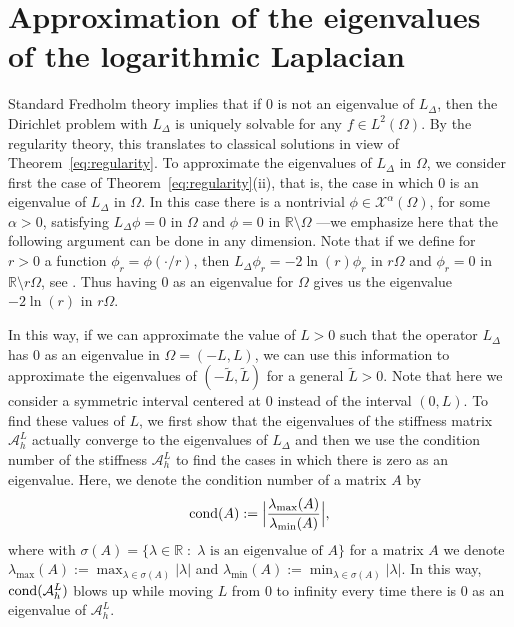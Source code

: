 \documentclass[11 pt]{article}
\numberwithin{equation}{section}
\def\tilde{\widetilde}
\def\R{\mathbb{R}}
\begin{document}
\section{Approximation of the eigenvalues of the logarithmic Laplacian}\label{eigenvalue approximation:sec}

Standard Fredholm theory implies that if $0$ is not an eigenvalue of $L_\Delta$, then the Dirichlet problem with $L_{\Delta}$ is uniquely solvable for any $f\in L^2(\Omega)$. By the regularity theory, this translates to classical solutions in view of  Theorem~\ref{eq:regularity}. To approximate the eigenvalues of $L_{\Delta}$ in $\Omega$, we consider first the case of Theorem~\ref{eq:regularity}(ii), that is, the case in which $0$ is an eigenvalue of $L_{\Delta}$ in $\Omega$. In this case there is a nontrivial $\phi\in \mathcal X^{\alpha}(\Omega)$, for some $\alpha>0$, satisfying $L_{\Delta}\phi=0$ in  $\Omega$ and $\phi=0$ in $\R\setminus \Omega$ ---we emphasize here that the following argument can be done in any dimension. Note that if we define for $r>0$ a function $\phi_r=\phi(\cdot/r)$, then $L_{\Delta}\phi_r=-2\ln(r)\phi_r$ in $r\Omega$ and $\phi_r=0$ in $\R\setminus r\Omega$, see \cite[Lemma 2.5]{LW21}. Thus having $0$ as an eigenvalue for $\Omega$ gives us the eigenvalue $-2\ln(r)$ in $r\Omega$.

In this way, if we can approximate the value of $L>0$ such that the operator $L_{\Delta}$ has $0$ as an eigenvalue in $\Omega=(-L,L)$, we can use this information to approximate the eigenvalues of $(-\tilde{L},\tilde{L})$ for a general $\tilde{L}>0$. Note that here we consider a symmetric interval centered at $0$ instead of the interval $(0,L)$. To find these values of $L$, we first show that the eigenvalues of the stiffness matrix $\mathcal A_h^L$ actually converge to the eigenvalues of $L_{\Delta}$ and then we use the condition number of the stiffness $\mathcal{A}^L_h$ to find the cases in which there is zero as an eigenvalue. Here, we denote the condition number of a matrix $A$ by
\begin{equation}\label{defi:condition}
\textnormal{cond}(A):=\Big|\frac{\lambda_{\max}(A)}{\lambda_{\min}(A)}\Big|,
\end{equation}
where with $\sigma(A)=\{\lambda\in \R\;:\; \lambda\text{ is an eigenvalue of $A$}\}$ for a matrix $A$ we denote $\lambda_{\max}(A):=\max_{\lambda\in \sigma(A)}|\lambda|$ and $\lambda_{\min}(A):=\min_{\lambda\in \sigma(A)}|\lambda|.$ In this way, $\textnormal{cond}(\mathcal{A}^L_h)$ blows up while moving $L$ from $0$ to infinity every time there is $0$ as an eigenvalue of $\mathcal{A}^L_h$.
\end{document}
